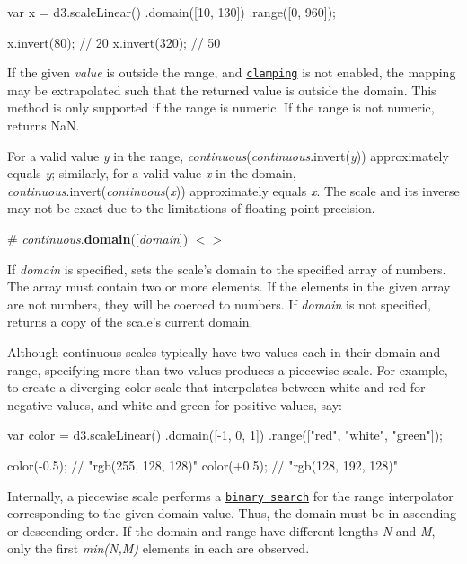 \begin{DoxyCode}
var x = d3.scaleLinear()
    .domain([10, 130])
    .range([0, 960]);

x.invert(80); // 20
x.invert(320); // 50
\end{DoxyCode}


If the given {\itshape value} is outside the range, and \href{#continuous_clamp}{\tt clamping} is not enabled, the mapping may be extrapolated such that the returned value is outside the domain. This method is only supported if the range is numeric. If the range is not numeric, returns NaN.

For a valid value {\itshape y} in the range, {\itshape continuous}({\itshape continuous}.invert({\itshape y})) approximately equals {\itshape y}; similarly, for a valid value {\itshape x} in the domain, {\itshape continuous}.invert({\itshape continuous}({\itshape x})) approximately equals {\itshape x}. The scale and its inverse may not be exact due to the limitations of floating point precision.

\label{_continuous_domain}%
\# {\itshape continuous}.{\bfseries domain}(\mbox{[}{\itshape domain}\mbox{]}) \href{https://github.com/d3/d3-scale/blob/master/src/continuous.js#L92}{\tt $<$$>$}

If {\itshape domain} is specified, sets the scale’s domain to the specified array of numbers. The array must contain two or more elements. If the elements in the given array are not numbers, they will be coerced to numbers. If {\itshape domain} is not specified, returns a copy of the scale’s current domain.

Although continuous scales typically have two values each in their domain and range, specifying more than two values produces a piecewise scale. For example, to create a diverging color scale that interpolates between white and red for negative values, and white and green for positive values, say\+:


\begin{DoxyCode}
var color = d3.scaleLinear()
    .domain([-1, 0, 1])
    .range(["red", "white", "green"]);

color(-0.5); // "rgb(255, 128, 128)"
color(+0.5); // "rgb(128, 192, 128)"
\end{DoxyCode}


Internally, a piecewise scale performs a \href{https://github.com/d3/d3-array#bisect}{\tt binary search} for the range interpolator corresponding to the given domain value. Thus, the domain must be in ascending or descending order. If the domain and range have different lengths {\itshape N} and {\itshape M}, only the first {\itshape min(\+N,\+M)} elements in each are observed.

